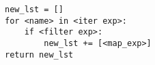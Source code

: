 \begin{lstlisting}
new_lst = []
for <name> in <iter exp>:
    if <filter exp>:
        new_lst += [<map_exp>]
return new_lst
\end{lstlisting}
